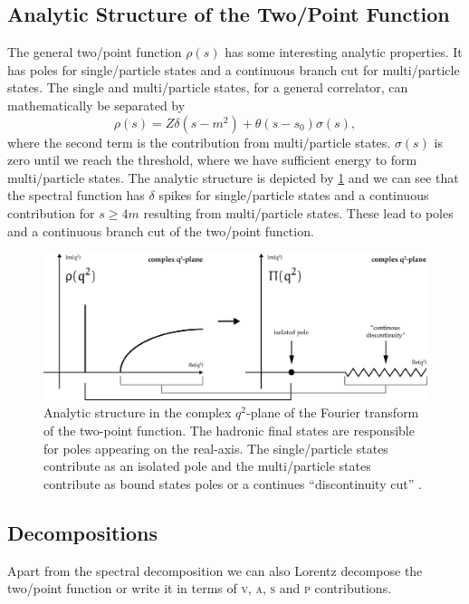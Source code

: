\documentclass[../../index.tex]{subfiles}
\begin{document}
\subsection{Analytic Structure of the Two\-/Point Function}
The general two\-/point function \(\rho(s)\) has some interesting analytic
properties. It has poles for single\-/particle states and a continuous branch cut
for multi\-/particle states. The single and multi\-/particle states, for a general
correlator, can mathematically be separated by
\begin{equation}
  \rho(s) = Z \delta(s-m^2) + \theta(s-s_0)\sigma(s),
\end{equation}
where the second term is the contribution from multi\-/particle states.
\(\sigma(s)\) is zero until we reach the threshold, where we have sufficient
energy to form multi\-/particle states. The analytic structure is depicted by
\cref{fig:analyticStructureCorrelator} and we can see that the spectral function
has \(\delta\) spikes for single\-/particle states and a continuous contribution
for \(s\geq 4m\) resulting from multi\-/particle states. These lead to poles and a
continuous branch cut of the two\-/point function.
\begin{figure}
  \centering
  \includegraphics[width=\textwidth]{./images/analyticStructureCorrelator.eps}
  \caption{Analytic structure in the complex \(q^2\)-plane of the Fourier
    transform of the two-point function. The hadronic final states are
    responsible for poles appearing on the real-axis. The single\-/particle states
    contribute as an isolated pole and the multi\-/particle states contribute as
    bound states poles or a continues ``discontinuity cut''
    \cite{Peskin1995,Zwicky2016}.}
  \label{fig:analyticStructureCorrelator}
\end{figure}

\subsection{Decompositions}
Apart from the spectral decomposition we can also Lorentz decompose the two\-/point
function or write it in terms of \textsc{v}, \textsc{a}, \textsc{s} and
\textsc{p} contributions.
\end{document}
